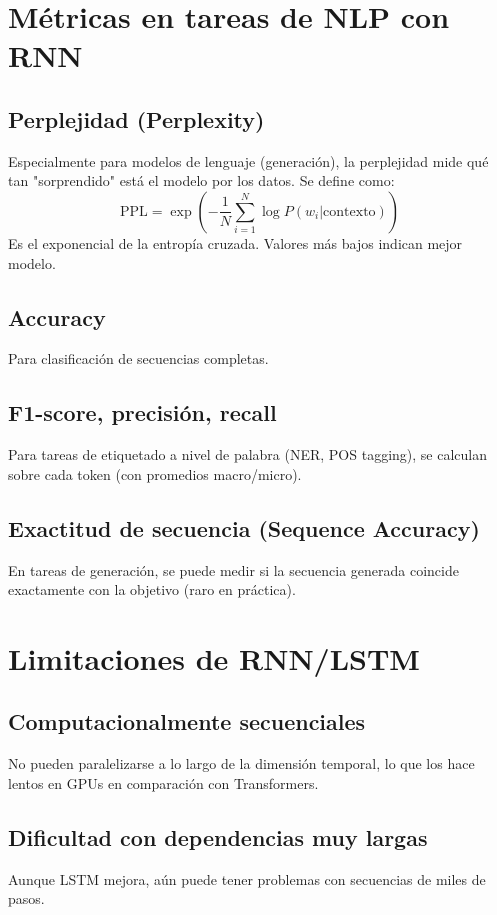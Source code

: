 \documentclass[12pt,a4paper,openany,oneside]{book}
\begin{document}
\section{Métricas en tareas de NLP con RNN}

\subsection{Perplejidad (Perplexity)}
Especialmente para modelos de lenguaje (generación), la perplejidad mide qué tan "sorprendido" está el modelo por los datos. Se define como:
\[
\text{PPL} = \exp\left( -\frac{1}{N} \sum_{i=1}^N \log P(w_i | \text{contexto}) \right)
\]
Es el exponencial de la entropía cruzada. Valores más bajos indican mejor modelo.

\subsection{Accuracy}
Para clasificación de secuencias completas.

\subsection{F1-score, precisión, recall}
Para tareas de etiquetado a nivel de palabra (NER, POS tagging), se calculan sobre cada token (con promedios macro/micro).

\subsection{Exactitud de secuencia (Sequence Accuracy)}
En tareas de generación, se puede medir si la secuencia generada coincide exactamente con la objetivo (raro en práctica).

\section{Limitaciones de RNN/LSTM}

\subsection{Computacionalmente secuenciales}
No pueden paralelizarse a lo largo de la dimensión temporal, lo que los hace lentos en GPUs en comparación con Transformers.

\subsection{Dificultad con dependencias muy largas}
Aunque LSTM mejora, aún puede tener problemas con secuencias de miles de pasos.
\end{document}
